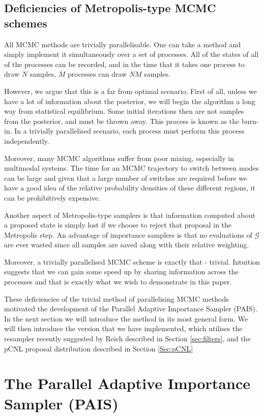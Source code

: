 \documentclass[final]{siamltex}
\begin{document}
\subsection{Deficiencies of Metropolis-type MCMC schemes}
All MCMC methods are trivially parallelisable. One can take a method
and simply implement it simultaneously over a set of processes. All
of the states of all of the processes can be recorded, and in the time
that it takes one process to draw $N$ samples, $M$ processes can draw
$NM$ samples. 

However, we argue that this is a far from optimal
scenario. First of all, unless we have a lot of information about the posterior, we will begin the algorithm a long way from statistical equilibrium. Some initial iterations then are not samples from the posterior, and must be thrown away. This process is known as the burn-in. In a trivially parallelised scenario, each process must perform this process independently.

Moreover, many MCMC algorithms suffer from poor mixing, especially in
multimodal systems. The time for an MCMC trajectory to switch between modes can be
large and given that a large number of switches are required before we have a
good idea of the relative probability densities of these different
regions, it can be prohibitively expensive.

Another aspect of Metropolis-type samplers is that information
computed about a proposed state is simply lost if we choose to reject
that proposal in the Metropolis step. An advantage of importance
samplers is that no evaluations of $\mathcal{G}$ are ever wasted
since all samples are saved along with their relative weighting.

Moreover, a trivially parallelised MCMC scheme is exactly that -
trivial. Intuition suggests that we can gain some speed up by sharing information across the processes and that is
exactly what we wish to demonstrate in this paper.

These deficiencies of the trivial method of parallelising MCMC methods
motivated the development of the Parallel Adaptive Importance Sampler
(PAIS). In the next section we will introduce the method in its most
general form. We will then introduce the version that we have
implemented, which utilises the resampler recently suggested by
Reich\cite{reich2013nonparametric} described in Section
\ref{sec:filters}, and the pCNL proposal distribution described in
Section \ref{Sec:pCNL}


\section{The Parallel Adaptive Importance Sampler \allowbreak (PAIS)}\label{Sec:PAIS}
\end{document}
